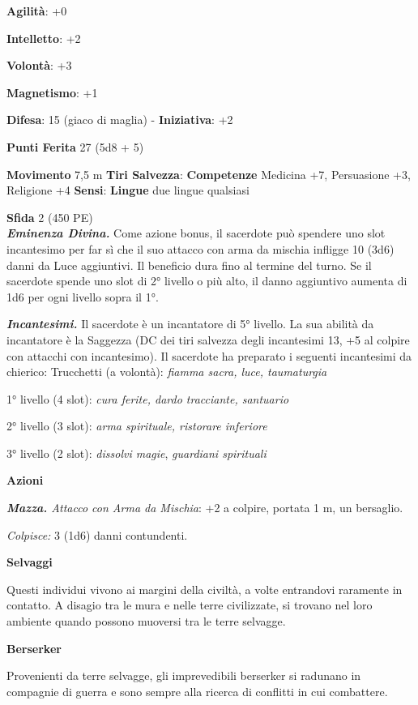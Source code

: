 \begin{multicols}{2}
\textbf{Agilità}: +0

\textbf{Intelletto}: +2

\textbf{Volontà}: +3

\textbf{Magnetismo}: +1

\textbf{Difesa}: 15 (giaco di maglia) - \textbf{Iniziativa}: +2

\textbf{Punti Ferita} 27 (5d8 + 5)

\textbf{Movimento} 7,5 m
\textbf{Tiri Salvezza}:
\textbf{Competenze} Medicina +7, Persuasione +3, Religione +4
\textbf{Sensi}:  \textbf{Lingue} due lingue
qualsiasi

\textbf{Sfida} 2 (450 PE)\smallskip\\

\emph{\textbf{Eminenza Divina.}} Come azione bonus, il sacerdote può
spendere uno slot incantesimo per far sì che il suo attacco con arma da
mischia infligge 10 (3d6) danni da Luce aggiuntivi. Il beneficio dura
fino al termine del turno. Se il sacerdote spende uno slot di 2° livello
o più alto, il danno aggiuntivo aumenta di 1d6 per ogni livello sopra il
1°.

\emph{\textbf{Incantesimi.}} Il sacerdote è un incantatore di 5°
livello. La sua abilità da incantatore è la Saggezza (DC dei tiri
salvezza degli incantesimi 13, +5 al colpire con attacchi con
incantesimo). Il sacerdote ha preparato i seguenti incantesimi da
chierico: Trucchetti (a volontà): \emph{fiamma sacra, luce, taumaturgia}

1° livello (4 slot): \emph{cura ferite, dardo tracciante, santuario}

2° livello (3 slot): \emph{arma spirituale, ristorare inferiore}

3° livello (2 slot): \emph{dissolvi magie}, \emph{guardiani spirituali}

\smallskip\textbf{Azioni}

\emph{\textbf{Mazza.} Attacco con Arma da Mischia}: +2 a colpire,
portata 1 m, un bersaglio.

\emph{Colpisce:} 3 (1d6) danni contundenti.



\textbf{Selvaggi}

Questi individui vivono ai margini della civiltà, a volte entrandovi
raramente in contatto. A disagio tra le mura e nelle terre civilizzate,
si trovano nel loro ambiente quando possono muoversi tra le terre
selvagge.

\textbf{Berserker}

Provenienti da terre selvagge, gli imprevedibili berserker si radunano
in compagnie di guerra e sono sempre alla ricerca di conflitti in cui
combattere.


\end{multicols}
